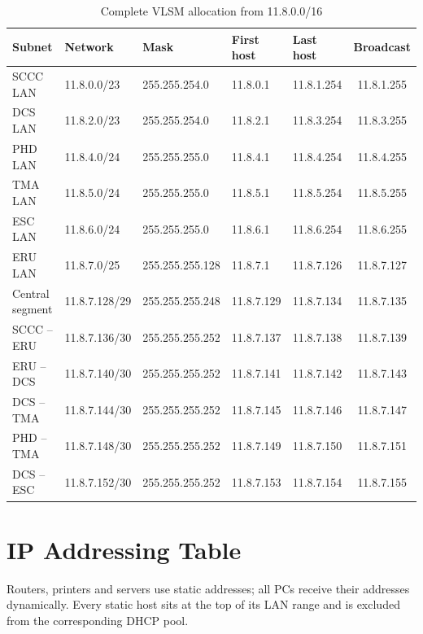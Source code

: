 \documentclass[11pt,a4paper]{article}
\begin{document}
\begin{table}[htbp]
\centering
\caption{Complete VLSM allocation from 11.8.0.0/16}
\label{tab:vlsm}
\small
\begin{tabular}{@{}lllllc@{}}
\toprule
\textbf{Subnet} & \textbf{Network} & \textbf{Mask} &
\textbf{First host} & \textbf{Last host} & \textbf{Broadcast} \\
\midrule
SCCC LAN        & 11.8.0.0/23    & 255.255.254.0   & 11.8.0.1   & 11.8.1.254 & 11.8.1.255 \\
DCS LAN         & 11.8.2.0/23    & 255.255.254.0   & 11.8.2.1   & 11.8.3.254 & 11.8.3.255 \\
PHD LAN         & 11.8.4.0/24    & 255.255.255.0   & 11.8.4.1   & 11.8.4.254 & 11.8.4.255 \\
TMA LAN         & 11.8.5.0/24    & 255.255.255.0   & 11.8.5.1   & 11.8.5.254 & 11.8.5.255 \\
ESC LAN         & 11.8.6.0/24    & 255.255.255.0   & 11.8.6.1   & 11.8.6.254 & 11.8.6.255 \\
ERU LAN         & 11.8.7.0/25    & 255.255.255.128 & 11.8.7.1   & 11.8.7.126 & 11.8.7.127 \\
Central segment & 11.8.7.128/29  & 255.255.255.248 & 11.8.7.129 & 11.8.7.134 & 11.8.7.135 \\
SCCC -- ERU     & 11.8.7.136/30  & 255.255.255.252 & 11.8.7.137 & 11.8.7.138 & 11.8.7.139 \\
ERU -- DCS      & 11.8.7.140/30  & 255.255.255.252 & 11.8.7.141 & 11.8.7.142 & 11.8.7.143 \\
DCS -- TMA      & 11.8.7.144/30  & 255.255.255.252 & 11.8.7.145 & 11.8.7.146 & 11.8.7.147 \\
PHD -- TMA      & 11.8.7.148/30  & 255.255.255.252 & 11.8.7.149 & 11.8.7.150 & 11.8.7.151 \\
DCS -- ESC      & 11.8.7.152/30  & 255.255.255.252 & 11.8.7.153 & 11.8.7.154 & 11.8.7.155 \\
\bottomrule
\end{tabular}
\end{table}

\clearpage
\section{IP Addressing Table}

Routers, printers and servers use static addresses; all PCs receive their
addresses dynamically. Every static host sits at the top of its LAN range and
is excluded from the corresponding DHCP pool.
\end{document}
